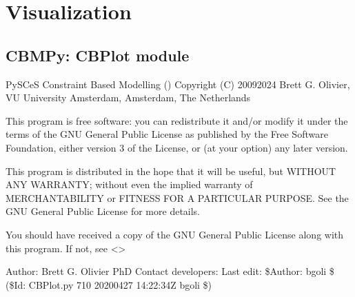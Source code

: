 \documentclass[letterpaper,12pt,english]{sphinxmanual}
\begin{document}
\begin{fulllineitems}
\begin{fulllineitems}
\begin{quote}
\begin{description}
\end{description}\end{quote}

\end{fulllineitems}


\end{fulllineitems}

\label{\detokenize{api/networking:module-cbmpy.miriamids}}
\sphinxstepscope


\section{Visualization}
\label{\detokenize{api/visualization:visualization}}\label{\detokenize{api/visualization::doc}}

\subsection{CBMPy: CBPlot module}
\label{\detokenize{api/visualization:cbmpy-cbplot-module}}\label{\detokenize{api/visualization:module-cbmpy.CBPlot}}
\sphinxAtStartPar
PySCeS Constraint Based Modelling ()
Copyright (C) 2009\sphinxhyphen{}2024 Brett G. Olivier, VU University Amsterdam, Amsterdam, The Netherlands

\sphinxAtStartPar
This program is free software: you can redistribute it and/or modify
it under the terms of the GNU General Public License as published by
the Free Software Foundation, either version 3 of the License, or
(at your option) any later version.

\sphinxAtStartPar
This program is distributed in the hope that it will be useful,
but WITHOUT ANY WARRANTY; without even the implied warranty of
MERCHANTABILITY or FITNESS FOR A PARTICULAR PURPOSE.  See the
GNU General Public License for more details.

\sphinxAtStartPar
You should have received a copy of the GNU General Public License
along with this program.  If not, see \textless{}\textgreater{}

\sphinxAtStartPar
Author: Brett G. Olivier PhD
Contact developers: 
Last edit: \$Author: bgoli \$ (\$Id: CBPlot.py 710 2020\sphinxhyphen{}04\sphinxhyphen{}27 14:22:34Z bgoli \$)
\end{document}
